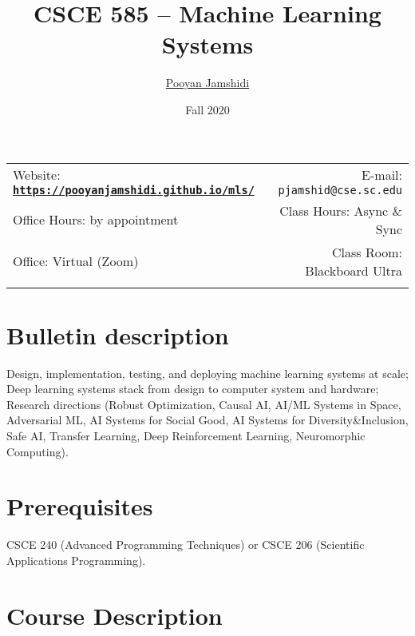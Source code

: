 \documentclass[11pt]{article}
\title{CSCE 585 -- Machine Learning Systems}
\author{\href{https://pooyanjamshidi.github.io/}{Pooyan Jamshidi}}
\date{Fall 2020}
\newcommand{\blankline}{\quad\pagebreak[2]}
\begin{document}
\maketitle

\blankline

\begin{tabular*}{.93\textwidth}{@{\extracolsep{\fill}}lr}


Website: \href{https://pooyanjamshidi.github.io/mls/}{\tt\bf https://pooyanjamshidi.github.io/mls/}  & E-mail: \texttt{pjamshid@cse.sc.edu} \\

Office Hours: by appointment  &  Class Hours: Async \& Sync \\

Office: Virtual (Zoom) & Class Room: Blackboard Ultra \\
&  \\

\hline
\end{tabular*}

\vspace{10mm}

\section*{Bulletin description}
Design, implementation, testing, and deploying machine learning systems at scale; Deep learning systems stack from design to computer system and hardware; Research directions (Robust Optimization, Causal AI, AI/ML Systems in Space, Adversarial ML, AI Systems for Social Good, AI Systems for Diversity\&Inclusion, Safe AI, Transfer Learning, Deep Reinforcement Learning, Neuromorphic Computing).

\section*{Prerequisites}
CSCE 240 (Advanced Programming Techniques) or CSCE 206 (Scientific Applications Programming).


\section*{Course Description}
\end{document}

